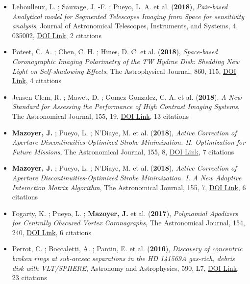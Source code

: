\documentclass[11pt]{article}
\begin{document}
\begin{itemize}
\item Leboulleux, L. ; Sauvage, J. -F. ; Pueyo, L. A. et al. ({\bf2018}), {\it Pair-based Analytical model for Segmented Telescopes Imaging from Space for sensitivity analysis}, Journal of Astronomical Telescopes, Instruments, and Systems, 4, 035002, \href{https://doi.org/10.1117/1.JATIS.4.3.035002}{DOI Link}, 2 citations

\item Poteet, C. A. ; Chen, C. H. ; Hines, D. C. et al. ({\bf2018}), {\it Space-based Coronagraphic Imaging Polarimetry of the TW Hydrae Disk: Shedding New Light on Self-shadowing Effects}, The Astrophysical Journal, 860, 115, \href{https://doi.org/10.3847/1538-4357/aac2e4}{DOI Link}, 4 citations

\item Jensen-Clem, R. ; Mawet, D. ; Gomez Gonzalez, C. A. et al. ({\bf2018}), {\it A New Standard for Assessing the Performance of High Contrast Imaging Systems}, The Astronomical Journal, 155, 19, \href{https://doi.org/10.3847/1538-3881/aa97e4}{DOI Link}, 13 citations

\item {\bf Mazoyer, J.} ; Pueyo, L. ; N'Diaye, M. et al. ({\bf2018}), {\it Active Correction of Aperture Discontinuities-Optimized Stroke Minimization. II. Optimization for Future Missions}, The Astronomical Journal, 155, 8, \href{https://doi.org/10.3847/1538-3881/aa91d7}{DOI Link}, 7 citations

\item {\bf Mazoyer, J.} ; Pueyo, L. ; N'Diaye, M. et al. ({\bf2018}), {\it Active Correction of Aperture Discontinuities-Optimized Stroke Minimization. I. A New Adaptive Interaction Matrix Algorithm}, The Astronomical Journal, 155, 7, \href{https://doi.org/10.3847/1538-3881/aa91cf}{DOI Link}, 6 citations

\item Fogarty, K. ; Pueyo, L. ; {\bf Mazoyer, J.} et al. ({\bf2017}), {\it Polynomial Apodizers for Centrally Obscured Vortex Coronagraphs}, The Astronomical Journal, 154, 240, \href{https://doi.org/10.3847/1538-3881/aa9063}{DOI Link}, 6 citations

\item Perrot, C. ; Boccaletti, A. ; Pantin, E. et al. ({\bf2016}), {\it Discovery of concentric broken rings at sub-arcsec separations in the HD 141569A gas-rich, debris disk with VLT/SPHERE}, Astronomy and Astrophysics, 590, L7, \href{https://doi.org/10.1051/0004-6361/201628396}{DOI Link}, 23 citations


\end{itemize}
\end{document}
